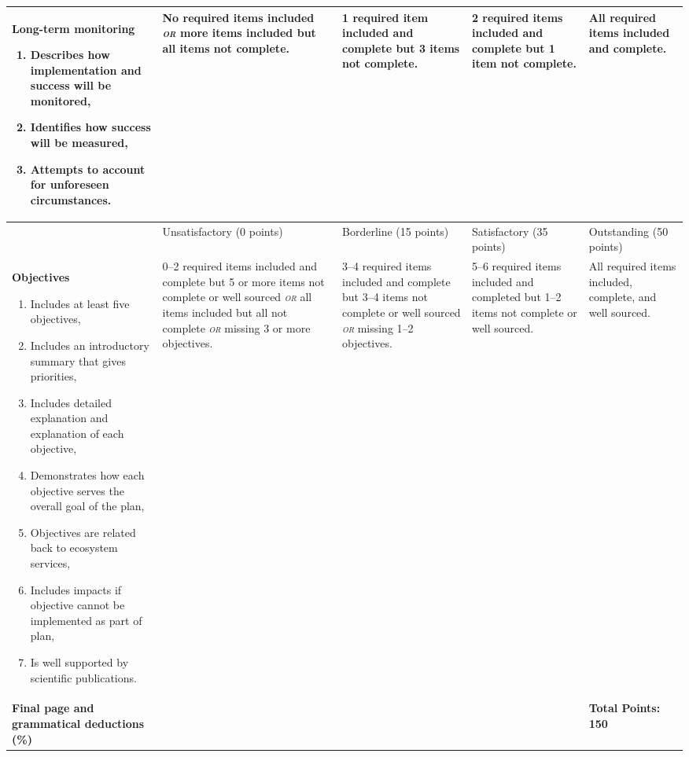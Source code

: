 \documentclass[10pt, twoside]{article}
\begin{document}
\begin{landscape}
{\begin{longtable}[l]{@{}L{5cm}L{4cm}L{4cm}L{4cm}L{4cm}@{}}
\midrule
\textbf{Long-term monitoring}\par
\vspace{-0.5\baselineskip}
\begin{enumerate}
\item Describes how implementation and success will be monitored,
\item Identifies how success will be measured,
\item Attempts to account for unforeseen circumstances.
\end{enumerate} &%
No required items included \textit{\textsc{or}} more items included but all items not complete. &%
1 required item included and complete but 3 items not complete. &%
2 required items included and complete but 1 item not complete. &%
All required items included and complete.\\[-1em]
\midrule
 & Unsatisfactory (0 points) & Borderline (15 points) & Satisfactory (35 points) & Outstanding (50 points) \\ 
 \midrule
\textbf{Objectives}\par
\vspace{-0.5\baselineskip}
\begin{enumerate}
\item Includes at least five objectives,
\item Includes an introductory summary that gives priorities,
\item Includes detailed explanation and explanation of each objective,
\item Demonstrates how each objective serves the overall goal of the plan,
\item Objectives are related back to ecosystem services,
\item Includes impacts if objective cannot be implemented as part of plan,
\item Is well supported by scientific publications. 
\end{enumerate} &%
0–2 required items included and complete but 5 or more items not complete or well sourced \textit{\textsc{or}} all items included but all not complete \emph{\textsc{or}} missing 3 or more objectives. &%
3–4 required items included and complete but 3–4 items not complete or well sourced \emph{\textsc{or}} missing 1–2 objectives. &%
5–6 required items included and completed but 1–2 items not complete or well sourced. &%
All required items included, complete, and well sourced.\\[-1em]
\midrule
\textbf{Final page and \newline grammatical deductions (\%)} & & & & \textbf{Total Points: 150} \\
\bottomrule
\end{longtable}
}%

\end{landscape}
\end{document}
